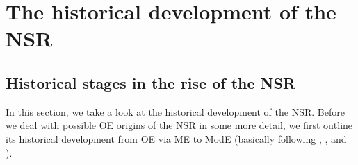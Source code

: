 \documentclass[output=paper]{langsci/langscibook}
\begin{document}
\section{The historical development of the NSR}
\label{sec:stages}

\subsection{Historical stages in the rise of the NSR}

In this section, we take a look at the historical development of the
\gls{NSR}.  Before we deal with possible \gls{OE}
origins of the \gls{NSR} in some more detail, we
first outline its historical development from \gls{OE} via \gls{ME} to ModE (basically following \citealt{Pietsch:2005a,Pietsch:2005b},
\citealt{deHaas:2011}, and \citealt{Cole2014}).
\end{document}
